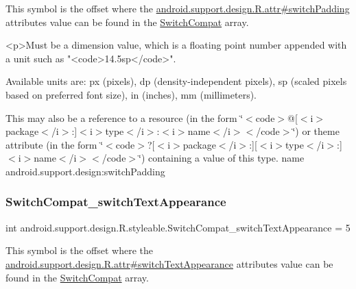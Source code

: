 This symbol is the offset where the \hyperlink{classandroid_1_1support_1_1design_1_1R_1_1attr_af3e0cfcf4fb4ee5950b8df4042cf6d06}{android.\+support.\+design.\+R.\+attr\#switch\+Padding} attribute\textquotesingle{}s value can be found in the \hyperlink{classandroid_1_1support_1_1design_1_1R_1_1styleable_a7389a923bf3e321b6b5d10b0589547a1}{Switch\+Compat} array.

\begin{DoxyVerb}      <p>Must be a dimension value, which is a floating point number appended with a unit such as "<code>14.5sp</code>".
\end{DoxyVerb}
 Available units are\+: px (pixels), dp (density-\/independent pixels), sp (scaled pixels based on preferred font size), in (inches), mm (millimeters). 

This may also be a reference to a resource (in the form \char`\"{}$<$code$>$@\mbox{[}$<$i$>$package$<$/i$>$\+:\mbox{]}$<$i$>$type$<$/i$>$\+:$<$i$>$name$<$/i$>$$<$/code$>$\char`\"{}) or theme attribute (in the form \char`\"{}$<$code$>$?\mbox{[}$<$i$>$package$<$/i$>$\+:\mbox{]}\mbox{[}$<$i$>$type$<$/i$>$\+:\mbox{]}$<$i$>$name$<$/i$>$$<$/code$>$\char`\"{}) containing a value of this type.  name android.\+support.\+design\+:switch\+Padding \mbox{\label{classandroid_1_1support_1_1design_1_1R_1_1styleable_ace25056c20b815fd199613151dcea0ec}} 
\subsubsection{\texorpdfstring{Switch\+Compat\+\_\+switch\+Text\+Appearance}{SwitchCompat\_switchTextAppearance}}
{\footnotesize\ttfamily int android.\+support.\+design.\+R.\+styleable.\+Switch\+Compat\+\_\+switch\+Text\+Appearance = 5\hspace{0.3cm}{\ttfamily [static]}}

This symbol is the offset where the \hyperlink{classandroid_1_1support_1_1design_1_1R_1_1attr_ac71231e27777af35142128f3a2243b31}{android.\+support.\+design.\+R.\+attr\#switch\+Text\+Appearance} attribute\textquotesingle{}s value can be found in the \hyperlink{classandroid_1_1support_1_1design_1_1R_1_1styleable_a7389a923bf3e321b6b5d10b0589547a1}{Switch\+Compat} array.

